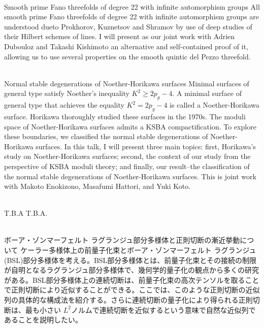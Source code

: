 \documentclass[dvipdfmx,a4paper,12pt]{article}
\theoremstyle{plain} %
\theoremstyle{definition} %
\begin{document}
\vskip3mm
\\
Smooth prime Fano threefolds of degree 22 with infinite automorphism groups 
\vskip3mm
All smooth prime Fano threefolds of degree 22 with infinite automorphism groups
are understood dueto Prokhorov, Kuznetsov and Shramov by use of deep studies of
their Hilbert schemes of lines. I will present as our joint work with
Adrien Dubouloz and Takashi Kishimoto an alternative and self-contained
proof of it, allowing us to use several properties on
the smooth quintic del Pezzo threefold. 

\vskip8mm

\\
Normal stable degenerations of Noether-Horikawa surfaces
\vskip3mm
Minimal surfaces of general type satisfy Noether's inequality $K^2 \geq 2p_g - 4$. A minimal surface of general type that achieves the equality $K^2 = 2p_g - 4$ is called a Noether-Horikawa surface. Horikawa thoroughly studied these surfaces in the 1970s.
The moduli space of Noether-Horikawa surfaces admits a KSBA compactification. To explore these boundaries, we classified the normal stable degenerations of Noether-Horikawa surfaces.
In this talk, I will present three main topics: first, Horikawa's study on Noether-Horikawa surfaces; second, the context of our study from the perspective of KSBA moduli theory; and finally, our result--the classification of the normal stable degenerations of Noether-Horikawa surfaces.
This is joint work with Makoto Enokizono, Masafumi Hattori, and Yuki Koto.
\vskip8mm
\newpage

\\
T.B.A
\vskip3mm
T.B.A.
\vskip8mm


\\
ボーア・ゾンマーフェルト ラグランジュ部分多様体と正則切断の漸近挙動について
\vskip3mm
ケーラー多様体上の前量子化束とボーア・ゾンマーフェルト ラグランジュ(BSL)部分多様体を考える。BSL部分多様体とは、前量子化束とその接続の制限が自明となるラグランジュ部分多様体で、幾何学的量子化の観点から多くの研究がある。BSL部分多様体上の連続切断は、前量子化束の高次テンソルを取ることで正則切断により近似することができる。ここでは、このような正則切断の近似列の具体的な構成法を紹介する。さらに連続切断の量子化により得られる正則切断は、最も小さい $L^2$ノルムで連続切断を近似するという意味で自然な近似列であることを説明したい。
\vskip8mm
\end{document}
